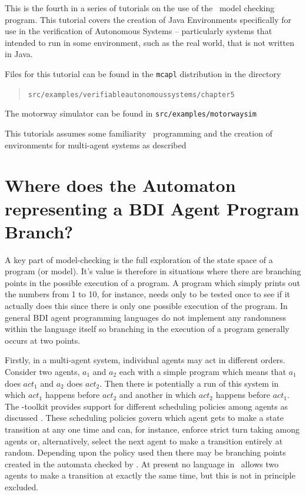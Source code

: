 
This is the fourth in a series of tutorials on the use of the \ajpf\ model checking program.  This tutorial covers the creation of Java Environments  specifically for use in the verification of Autonomous Systems -- particularly systems that intended to run in some environment, such as the real world, that is not written in Java.

Files for this tutorial can be found in the \texttt{mcapl} distribution in the directory 
\begin{quote}
\texttt{src/examples/verifiableautonomoussystems/chapter5}
\end{quote}
The motorway simulator can be found
in \texttt{src/examples/motorwaysim}

This tutorials assumes some familiarity \gwendolen\ programming and the creation of environments for multi-agent systems as described 


\section{Where does the Automaton representing a BDI Agent Program Branch?}
\label{sec:branching}

A key part of model-checking is the full exploration of the state
space of a program (or model).  It's value is therefore in situations
where there are branching points in the possible execution of a
program.  A program which simply prints out the numbers from 1 to 10,
for instance, needs only to be tested once to see if it actually does
this since there is only one possible execution of the program.  In
general BDI agent programming languages do not implement any
randomness within the language itself so branching in the execution of
a program generally occurs at two points.

Firstly, in a multi-agent system, individual agents may act in
different orders.  Consider two agents, $a_1$ and $a_2$ each with a
simple program which means that $a_1$ does $act_1$ and $a_2$ does
$act_2$.  Then there is potentially a run of this system in which
$act_1$ happens before $act_2$ and another in which $act_2$ happens
before $act_1$.  The \ail-toolkit provides support for different
scheduling policies among agents as discussed .  These scheduling policies govern
which agent gets to make a state transition at any one time and can,
for instance, enforce strict turn taking among agents or,
alternatively, select the next agent to make a transition entirely at
random.  Depending upon the policy used then there may be branching
points created in the automata checked by \ajpf.  At present no
language in \ajpf\ allows two agents to make a transition at exactly
the same time, but this is not in principle excluded.


